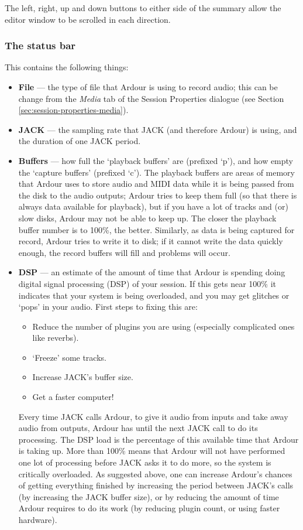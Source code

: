 \documentclass[10pt,a4paper]{book}
\begin{document}
{The left, right, up and down buttons to either side of the summary
allow the editor window to be scrolled in each direction.

\subsubsection{The status bar}

This contains the following things:
\begin{itemize}
\item \textbf{File} --- the type of file that Ardour is using to record audio;
  this can be change from the \emph{Media} tab of the Session
  Properties dialogue (see Section
  \ref{sec:session-properties-media}).
\item \textbf{JACK} --- the sampling rate that JACK (and therefore Ardour) is
  using, and the duration of one JACK period.
\item \textbf{Buffers} --- how full the `playback buffers' are (prefixed `p'),
  and how empty the `capture buffers' (prefixed `c').  The playback
  buffers are areas of memory that Ardour uses to store audio and MIDI
  data while it is being passed from the disk to the audio outputs;
  Ardour tries to keep them full (so that there is always data
  available for playback), but if you have a lot of tracks and (or)
  slow disks, Ardour may not be able to keep up.  The closer the
  playback buffer number is to 100\%, the better.  Similarly, as data
  is being captured for record, Ardour tries to write it to disk; if
  it cannot write the data quickly enough, the record buffers will
  fill and problems will occur.
\item {} \textbf{DSP} --- an estimate of the amount of time
  that Ardour is spending doing digital signal processing (DSP) of
  your session.  If this gets near 100\% it indicates that your system
  is being overloaded, and you may get glitches or `pops' in your
  audio.  First steps to fixing this are:
\begin{itemize}
\item Reduce the number of plugins you are using (especially
  complicated ones like reverbs).
\item `Freeze' some tracks.
\item Increase JACK's buffer size.
\item Get a faster computer!
\end{itemize}

\begin{danger}
Every time JACK calls Ardour, to give it audio from inputs and take
away audio from outputs, Ardour has until the next JACK call to do its
processing.  The DSP load is the percentage of this available time
that Ardour is taking up.  More than 100\% means that Ardour will not
have performed one lot of processing before JACK asks it to do more,
so the system is critically overloaded.  As suggested above, one can
increase Ardour's chances of getting everything finished by increasing
the period between JACK's calls (by increasing the JACK buffer size),
or by reducing the amount of time Ardour requires to do its work (by
reducing plugin count, or using faster hardware).
\end{danger}


\end{itemize}}
\end{document}
